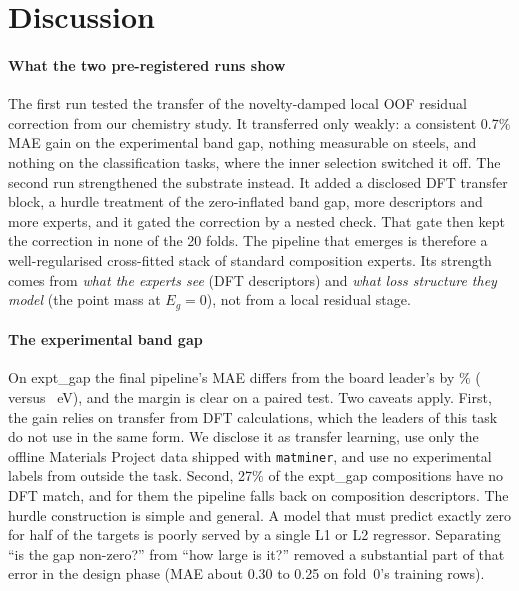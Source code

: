 \section{Discussion}
\label{sec:discussion}

\paragraph{What the two pre-registered runs show}
The first run tested the transfer of the novelty-damped local OOF residual correction from our chemistry study.
It transferred only weakly: a consistent 0.7\% MAE gain on the experimental band gap, nothing measurable on steels, and nothing on the classification tasks, where the inner selection switched it off.
The second run strengthened the substrate instead. It added a disclosed DFT transfer block, a hurdle treatment of the zero-inflated band gap, more descriptors and more experts, and it gated the correction by a nested check.
That gate then kept the correction in none of the 20 folds.
The pipeline that emerges is therefore a well-regularised cross-fitted stack of standard composition experts. Its strength comes from \emph{what the experts see} (DFT descriptors) and \emph{what loss structure they model} (the point mass at $E_g=0$), not from a local residual stage.

\paragraph{The experimental band gap}
On expt\_gap the final pipeline's MAE differs from the board leader's by \AtwoRelGap\% (\AtwoFinalGap{} versus \AtwoLeaderGap~eV), and the margin is clear on a paired test.
Two caveats apply.
First, the gain relies on transfer from DFT calculations, which the leaders of this task do not use in the same form. We disclose it as transfer learning, use only the offline Materials Project data shipped with \texttt{matminer}, and use no experimental labels from outside the task.
Second, 27\% of the expt\_gap compositions have no DFT match, and for them the pipeline falls back on composition descriptors.
The hurdle construction is simple and general. A model that must predict exactly zero for half of the targets is poorly served by a single L1 or L2 regressor. Separating ``is the gap non-zero?'' from ``how large is it?'' removed a substantial part of that error in the design phase (MAE about 0.30 to 0.25 on fold~0's training rows).

